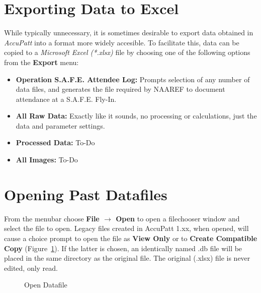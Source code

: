 \documentclass[10pt,letterpaper,titlepage]{article}
\begin{document}
    \section{Exporting Data to Excel}
    While typically unnecessary, it is sometimes desirable to export data obtained in \textit{AccuPatt} into a format more widely accesible. To facilitate this, data can be copied to a \textit{Microsoft Excel (*.xlsx)} file by choosing one of the following options from the \textbf{Export} menu:
    \begin{itemize}
        \item \textbf{Operation S.A.F.E. Attendee Log:} Prompts selection of any number of data files, and generates the file required by NAAREF to document attendance at a S.A.F.E. Fly-In.
        \item \textbf{All Raw Data:} Exactly like it sounds, no processing or calculations, just the data and parameter settings.
        \item \textbf{Processed Data:} \color{red} To-Do \color{black}
        \item \textbf{All Images:} \color{red} To-Do \color{black}
    \end{itemize}
    \newpage

    \section{Opening Past Datafiles}
    From the menubar choose \textbf{File $\rightarrow$ Open} to open a filechooser window and select the file to open. Legacy files created in AccuPatt 1.xx, when opened, will cause a choice prompt to open the file as \textbf{View Only} or to \textbf{Create Compatible Copy} (Figure~\ref{fig:open}). If the latter is chosen, an identically named .db file will be placed in the same directory as the original file. The original (.xlsx) file is never edited, only read.
    \begin{figure}[hb]
        \centering
        \caption{Open Datafile}
        \label{fig:open}
    \end{figure}
    \newpage
\end{document}
